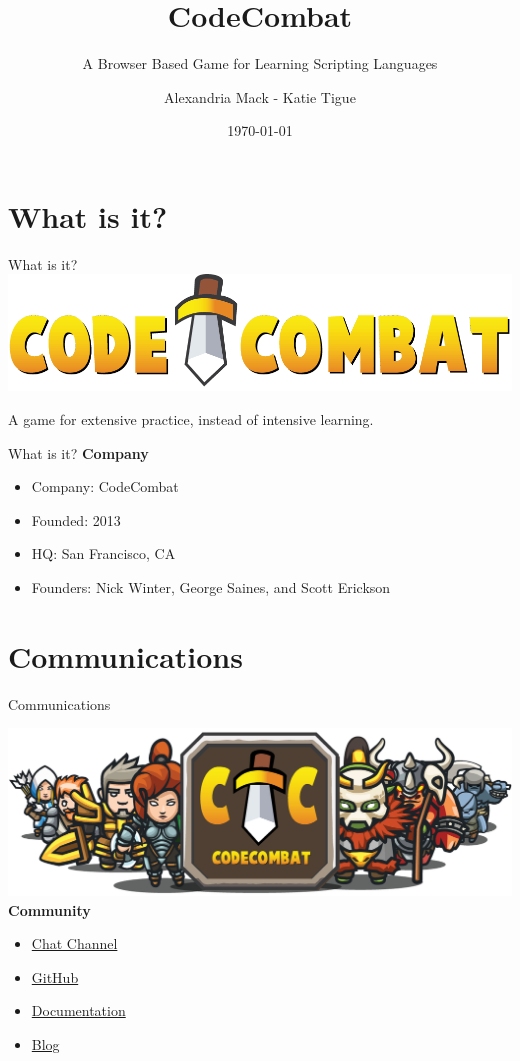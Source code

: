 \documentclass[10pt, compress]{beamer}
\title{CodeCombat}
\subtitle{A Browser Based Game for Learning Scripting Languages}
\date{\today}
\author{Alexandria Mack - Katie Tigue}
\institute{}
\begin{document}
\maketitle

\section{What is it?}

\begin{frame}{What is it?}
\includegraphics[width=\textwidth]{images/logo.png}
\begin{center}A game for extensive practice, instead of intensive learning.\end{center}
\end{frame}
    
    \begin{frame}{What is it?}
    \textbf{Company}
    \begin{itemize}
    \item Company: CodeCombat
    \item Founded: 2013
    \item HQ: San Francisco, CA
    \item Founders: Nick Winter, George Saines, and Scott Erickson
    \end{itemize}
    \end{frame}


\section{Communications}

\begin{frame}{Communications}

\includegraphics[width=\textwidth]{images/masthead.png}\\
\textbf{Community}
\begin{itemize}
\item \href{https://www.hipchat.com/g3plnOKqa}{\alert{Chat Channel}}
\item \href{https://github.com/codecombat/codecombat}{\alert{GitHub}}
\item \href{https://github.com/codecombat/codecombat/wiki}{\alert{Documentation}}
\item \href{http://blog.codecombat.com}{\alert{Blog}}
\end{itemize}

\end{frame}
\end{document}
